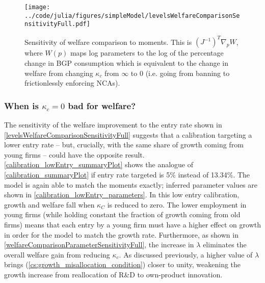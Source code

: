 \documentclass[ecta,nameyear,draft]{econsocart}
\theoremstyle{plain}
\theoremstyle{remark}
\begin{document}
\begin{appendix}
\begin{figure}[]
	\centering
	\texttt{[image: ../code/julia/figures/simpleModel/levelsWelfareComparisonSensitivityFull.pdf]}
	\caption{Sensitivity of welfare comparison to moments. This is $(J^{-1})^T \nabla_p W$, where $W(p)$ maps log parameters to the log of the percentage change in BGP consumption which is equivalent to the change in welfare from changing $\kappa_c$ from $\infty$ to $0$ (i.e. going from banning to frictionlessly enforcing NCAs).}
	\label{levelsWelfareComparisonSensitivityFull}
\end{figure}


\subsubsection{When is $\kappa_c = 0$ bad for welfare?}

The sensitivity of the welfare improvement to the entry rate shown in \autoref{levelsWelfareComparisonSensitivityFull} suggests that a calibration targeting a lower entry rate -- but, crucially, with the same share of growth coming from young firms -- could have the opposite result. \autoref{calibration_lowEntry_summaryPlot} shows the analogue of \autoref{calibration_summaryPlot} if entry rate targeted is 5\% instead of 13.34\%. The model is again able to match the moments exactly; inferred parameter values are shown in \autoref{calibration_lowEntry_parameters}. In this low entry calibration, growth and welfare fall when $\kappa_C$ is reduced to zero. The lower employment in young firms (while holding constant the fraction of growth coming from old firms) means that each entry by a young firm must have a higher effect on growth in order for the model to match the growth rate. Furthermore, as shown in \autoref{welfareComparisonParameterSensitivityFull}, the increase in $\lambda$ eliminates the overall welfare gain from reducing $\kappa_c$. As discussed previously, a higher value of $\lambda$ brings (\ref{cs:growth_misallocation_condition}) closer to unity, weakening the growth increase from reallocation of R\&D to own-product innovation.


\end{appendix}
\end{document}
